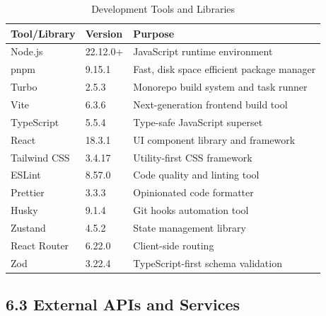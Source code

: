 \documentclass[12pt,a4paper]{article}
\begin{document}
\begin{table}[h]
\centering
\small
\begin{tabular}{|l|l|p{8cm}|}
\hline
\textbf{Tool/Library} & \textbf{Version} & \textbf{Purpose} \\
\hline
Node.js & 22.12.0+ & JavaScript runtime environment \\
\hline
pnpm & 9.15.1 & Fast, disk space efficient package manager \\
\hline
Turbo & 2.5.3 & Monorepo build system and task runner \\
\hline
Vite & 6.3.6 & Next-generation frontend build tool \\
\hline
TypeScript & 5.5.4 & Type-safe JavaScript superset \\
\hline
React & 18.3.1 & UI component library and framework \\
\hline
Tailwind CSS & 3.4.17 & Utility-first CSS framework \\
\hline
ESLint & 8.57.0 & Code quality and linting tool \\
\hline
Prettier & 3.3.3 & Opinionated code formatter \\
\hline
Husky & 9.1.4 & Git hooks automation tool \\
\hline
Zustand & 4.5.2 & State management library \\
\hline
React Router & 6.22.0 & Client-side routing \\

\hline
Zod & 3.22.4 & TypeScript-first schema validation \\
\hline
\end{tabular}
\caption{Development Tools and Libraries}
\end{table}
\newpage

\subsection*{\textbf{6.3 External APIs and Services}}
\end{document}
